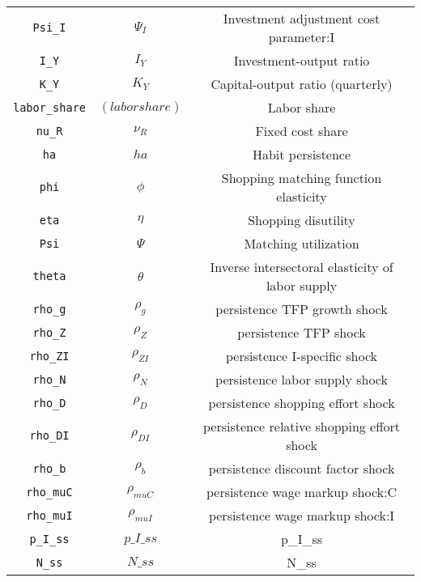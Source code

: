 \begin{center}
\begin{longtable}{ccc}
\texttt{Psi\_I} & ${\Psi_I}$ & Investment adjustment cost parameter:I\\
\texttt{I\_Y} & ${I_Y}$ & Investment-output ratio\\
\texttt{K\_Y} & ${K_Y}$ & Capital-output ratio (quarterly)\\
\texttt{labor\_share} & $(labor share)$ & Labor share\\
\texttt{nu\_R} & ${\nu_R}$ & Fixed cost share\\
\texttt{ha} & ${ha}$ & Habit persistence\\
\texttt{phi} & ${\phi}$ & Shopping matching function elasticity\\
\texttt{eta} & ${\eta}$ & Shopping disutility\\
\texttt{Psi} & ${\Psi}$ & Matching utilization\\
\texttt{theta} & ${\theta}$ & Inverse intersectoral elasticity of labor supply\\
\texttt{rho\_g} & ${\rho_g}$ & persistence TFP growth shock\\
\texttt{rho\_Z} & ${\rho_Z}$ & persistence TFP shock\\
\texttt{rho\_ZI} & ${\rho_{ZI}}$ & persistence I-specific shock\\
\texttt{rho\_N} & ${\rho_N}$ & persistence labor supply shock\\
\texttt{rho\_D} & ${\rho_D}$ & persistence shopping effort shock\\
\texttt{rho\_DI} & ${\rho_{DI}}$ & persistence relative shopping effort shock\\
\texttt{rho\_b} & ${\rho_b}$ & persistence discount factor shock\\
\texttt{rho\_muC} & ${\rho_{muC}}$ & persistence wage markup shock:C\\
\texttt{rho\_muI} & ${\rho_{muI}}$ & persistence wage markup shock:I\\
\texttt{p\_I\_ss} & $p\_I\_ss$ & p\_I\_ss\\
\texttt{N\_ss} & $N\_ss$ & N\_ss\\
\hline%
\end{longtable}
\end{center}
